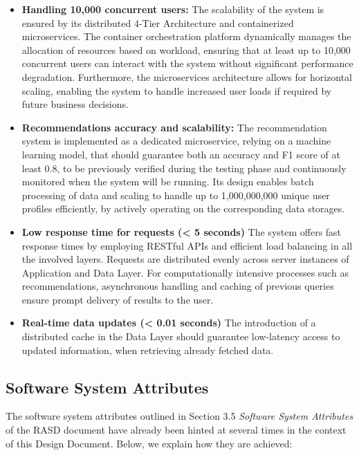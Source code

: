\begin{itemize}
\item \textbf{Handling 10,000 concurrent users:}
The scalability of the system is ensured by its distributed 4-Tier Architecture and containerized microservices. The container orchestration platform dynamically manages the allocation of resources based on workload, ensuring that at least up to 10,000 concurrent users can interact with the system without significant performance degradation. Furthermore, the microservices architecture allows for horizontal scaling, enabling the system to handle increased user loads if required by future business decisions.

\item \textbf{Recommendations accuracy and scalability:}
The recommendation system is implemented as a dedicated microservice, relying on a machine learning model, that should guarantee both an accuracy and F1 score of at least 0.8, to be previously verified during the testing phase and continuously monitored when the system will be running. Its design enables batch processing of data and scaling to handle up to 1,000,000,000 unique user profiles efficiently, by actively operating on the corresponding data storages.

\item \textbf{Low response time for requests (< 5 seconds)}
The system offers fast response times by employing RESTful APIs and efficient load balancing in all the involved layers. Requests are distributed evenly across server instances of Application and Data Layer. For computationally intensive processes such as recommendations, asynchronous handling and caching of previous queries ensure prompt delivery of results to the user.

\item \textbf{Real-time data updates (< 0.01 seconds)}
The introduction of a distributed cache in the Data Layer should guarantee low-latency access to updated information, when retrieving already fetched data.
\end{itemize}

\newpage

\subsection{Software System Attributes}
\label{subsec:software_system_attributes}

The software system attributes outlined in Section 3.5 \textit{Software System Attributes} of the RASD document have already been hinted at several times in the context of this Design Document.
Below, we explain how they are achieved:

